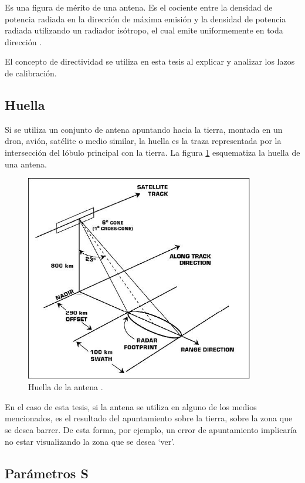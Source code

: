 Es una figura de mérito de una antena. Es el cociente entre la densidad de potencia radiada en la dirección de máxima emisión
y la densidad de potencia radiada utilizando un radiador isótropo, el cual emite uniformemente en toda dirección
\cite{Standard1996}.

El concepto de directividad se utiliza en esta tesis al explicar y analizar los lazos de calibración.


\subsection{Huella} 

Si se utiliza un conjunto de antena apuntando hacia la tierra, montada en un dron, avión, satélite o medio similar, la
huella es la traza representada por la intersección del lóbulo principal con la tierra. La figura \ref{fig:huellaSatellite}
esquematiza la huella de una antena.

\begin{figure}[H]
 \centering
 \includegraphics[width=10cm]{gfx/satellite.png}
 \caption{Huella de la antena \cite{FootprintSatellite}.}
 \label{fig:huellaSatellite}
\end{figure}

En el caso de esta tesis, si la antena se utiliza en alguno de los medios mencionados, es el resultado del apuntamiento sobre la
tierra, sobre la zona que se desea barrer. De esta forma, por ejemplo, un error de apuntamiento implicaría no estar visualizando
la zona que se desea \enquote*{ver}.


\subsection{Parámetros S} 

